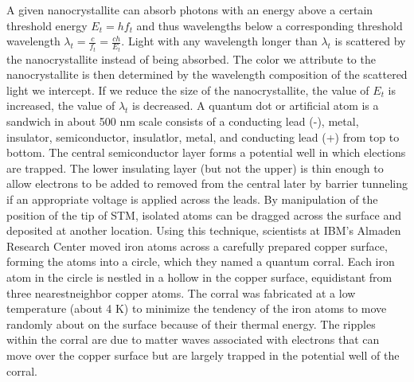\documentclass[a4paper,12pt]{article}
\begin{document}
A given nanocrystallite can absorb photons with an energy above a certain threshold energy $E_t = hf_t$ and thus wavelengths below a corresponding threshold wavelength $\lambda_t = \frac{c}{f_t} = \frac{ch}{E_t}$. Light with any wavelength longer than $\lambda_t$ is scattered by the nanocrystallite  instead of being absorbed. The color we attribute to the nanocrystallite is then determined by the wavelength composition of the scattered light we intercept. If we reduce the size of the nanocrystallite, the value of $E_t$ is increased, the value of $\lambda_t$ is decreased.
A quantum dot or artificial atom is a sandwich in about 500 nm scale consists of a conducting lead (-), metal, insulator, semiconductor, insulatlor, metal, and conducting lead (+) from top to bottom. The central semiconductor layer forms a potential well in which elections are trapped. The lower insulating layer (but not the upper) is thin enough to allow electrons to be added to removed from the central later by barrier tunneling if an appropriate voltage is applied across the leads.
By manipulation of the position of the tip of STM, isolated atoms can be dragged across the surface and deposited at another location. Using this technique, scientists at IBM's Almaden Research Center moved iron atoms across a carefully prepared copper surface, forming the atoms into a circle, which they named a quantum corral. Each iron atom in the circle is nestled in a hollow in the copper surface, equidistant from three  nearestneighbor copper atoms. The corral was fabricated at a low temperature (about 4 K) to minimize the tendency of the iron atoms to move randomly about on the surface because of their thermal energy. The ripples within the corral are due to matter waves associated with electrons that can move over the copper surface but are largely trapped in the potential well of the corral.
\end{document}

